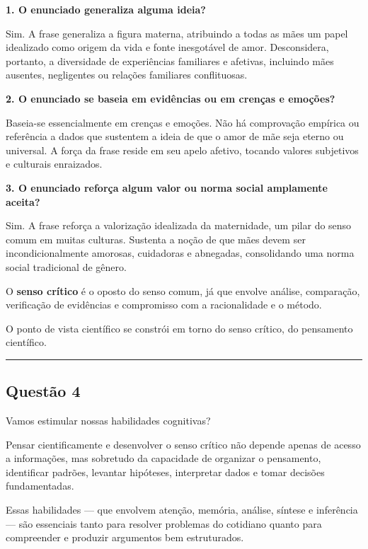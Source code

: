 \documentclass[
  letterpaper,
  DIV=11,
  numbers=noendperiod]{scrreprt}
\begin{document}
\textbf{1. O enunciado generaliza alguma ideia?}

Sim. A frase generaliza a figura materna, atribuindo a todas as mães um
papel idealizado como origem da vida e fonte inesgotável de amor.
Desconsidera, portanto, a diversidade de experiências familiares e
afetivas, incluindo mães ausentes, negligentes ou relações familiares
conflituosas.

\textbf{2. O enunciado se baseia em evidências ou em crenças e emoções?}

Baseia-se essencialmente em crenças e emoções. Não há comprovação
empírica ou referência a dados que sustentem a ideia de que o amor de
mãe seja eterno ou universal. A força da frase reside em seu apelo
afetivo, tocando valores subjetivos e culturais enraizados.

\textbf{3. O enunciado reforça algum valor ou norma social amplamente
aceita?}

Sim. A frase reforça a valorização idealizada da maternidade, um pilar
do senso comum em muitas culturas. Sustenta a noção de que mães devem
ser incondicionalmente amorosas, cuidadoras e abnegadas, consolidando
uma norma social tradicional de gênero.

O \textbf{senso crítico} é o oposto do senso comum, já que envolve
análise, comparação, verificação de evidências e compromisso com a
racionalidade e o método.

O ponto de vista científico se constrói em torno do senso crítico, do
pensamento científico.

\begin{center}\rule{0.5\linewidth}{0.5pt}\end{center}

\subsection{Questão 4}\label{questuxe3o-4-2}

Vamos estimular nossas habilidades cognitivas?

Pensar cientificamente e desenvolver o senso crítico não depende apenas
de acesso a informações, mas sobretudo da capacidade de organizar o
pensamento, identificar padrões, levantar hipóteses, interpretar dados e
tomar decisões fundamentadas.

Essas habilidades --- que envolvem atenção, memória, análise, síntese e
inferência --- são essenciais tanto para resolver problemas do cotidiano
quanto para compreender e produzir argumentos bem estruturados.
\end{document}
